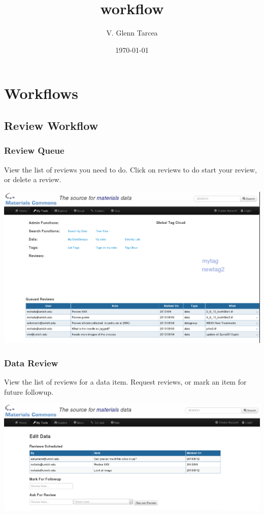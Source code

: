 \documentclass[11pt]{article}
\author{V. Glenn Tarcea}
\date{\today}
\title{workflow}
\begin{document}
\maketitle
\tableofcontents


\section{Workflows}
\label{sec-1}

\subsection{Review Workflow}
\label{sec-1-1}

\subsubsection{Review Queue}
\label{sec-1-1-1}
View the list of reviews you need to do. Click on reviews to do start your review, or delete a review.

\includegraphics[width=.9\linewidth]{ReviewQueue.png}

\subsubsection{Data Review}
\label{sec-1-1-2}
View the list of reviews for a data item. Request reviews, or mark an item for future followup.

\includegraphics[width=.9\linewidth]{DataReview.png}
\end{document}
